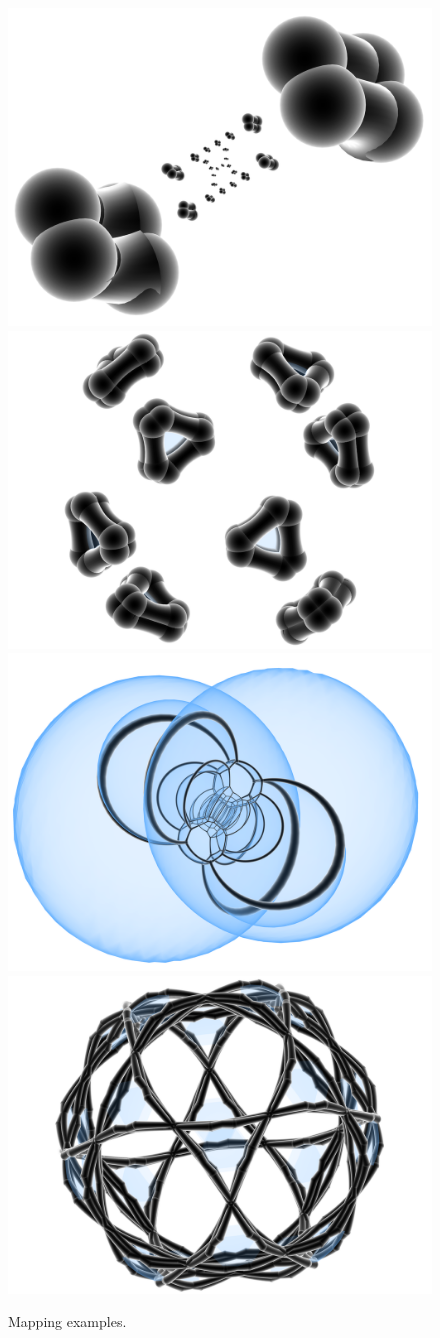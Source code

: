 \documentclass{article}
\begin{document}
\begin{figure}[h!!t]
\begin{center}
		\vspace{2mm}
		\includegraphics[width = .45\textwidth]{../Examples/0xdb410f50dc59f1ba.png}
		\includegraphics[width = .45\textwidth]{../Examples/0xd1410f70dc59f0ac.png}
		\vspace{2mm}
		\includegraphics[width = .45\textwidth]{../Examples/0xdb400f50dc50f13a.png}
		\includegraphics[width = .45\textwidth]{../Examples/0xd2410ef0d859f4be.png}
	\end{center}
	\caption{Mapping examples.}
	\label{projections}
\end{figure}
\end{document}
